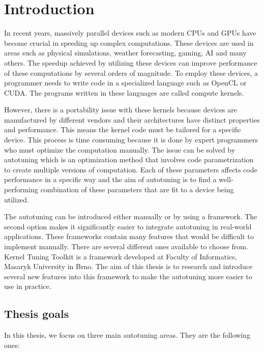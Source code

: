 \documentclass[
  digital,     %
  oneside,     %
  nosansbold,  %
  nocolorbold, %
  lof,         %
  lot,         %
]{fithesis4}
\begin{document}
\chapter{Introduction}
In recent years, massively parallel devices such as modern CPUs and GPUs have become crucial in speeding up complex computations. These devices are used in areas such as physical simulations, weather forecasting, gaming, AI and many others. The speedup achieved by utilizing these devices can improve performance of these computations by several orders of magnitude. To employ these devices, a programmer needs to write code in a specialized language such as OpenCL or CUDA. The programs written in these languages are called compute kernels.

However, there is a portability issue with these kernels because devices are manufactured by different vendors and their architectures have distinct properties and performance. This means the kernel code must be tailored for a specific device. This process is time consuming because it is done by expert programmers who must optimize the computation manually. The issue can be solved by autotuning \cite{balaprakash2018autotuning} which is an optimization method that involves code parametrization to create multiple versions of computation. Each of these parameters affects code performance in a specific way and the aim of autotuning is to find a well-performing combination of these parameters that are fit to a device being utilized.

The autotuning can be introduced either manually or by using a framework. The second option makes it significantly easier to integrate autotuning in real-world applications. These frameworks contain many features that would be difficult to implement manually. There are several different ones available to choose from. Kernel Tuning Toolkit is a framework developed at Faculty of Informatics, Masaryk University in Brno. The aim of this thesis is to research and introduce several new features into this framework to make the autotuning more easier to use in practice.

\section{Thesis goals}
In this thesis, we focus on three main autotuning areas. They are the following ones:
\end{document}
